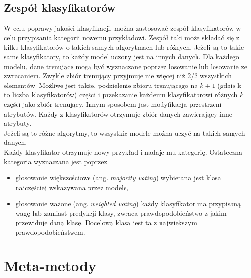   	
\subsection{Zespół klasyfikatorów}
W celu poprawy jakości klasyfikacji, można zastosować zespół klasyfikatorów w celu przypisania kategorii nowemu przykładowi. Zespół taki może składać się z kilku klasyfikatorów o takich samych algorytmach lub różnych. Jeżeli są to takie same klasyfikatory, to każdy model uczony jest na innych danych. Dla każdego modelu, dane trenujące mogą być wyznaczane poprzez losowanie lub losowanie ze zwracaniem. Zwykle zbiór trenujący przyjmuje nie więcej niż 2/3 wszystkich elementów. Możliwe jest także, podzielenie zbioru trenującego na $k+1$ (gdzie k to liczba klasyfikatorów) części i przekazanie każdemu klasyfikatorowi różnych $k$ części jako zbiór trenujący. Innym sposobem jest modyfikacja przestrzeni atrybutów. Każdy z klasyfikatorów otrzymuje zbiór danych zawierający inne atrybuty. \\
Jeżeli są to różne algorytmy, to wszystkie modele można uczyć na takich samych danych. \\
Każdy klasyfikator otrzymuje nowy przykład i nadaje mu kategorię. Ostateczna kategoria wyznaczana jest poprzez:
\begin{itemize}
	\item głosowanie większościowe (ang. \textit{majority voting}) wybierana jest klasa najczęściej wskazywana przez modele,
	\item głosowanie ważone (ang. \textit{weighted voting}) każdy klasyfikator ma przypisaną wagę lub zamiast predykcji klasy, zwraca prawdopodobieństwo z jakim przewiduje daną klasę. Docelową klasą jest ta z największym prawdopodobieństwem.
\end{itemize} 
\section{Meta-metody}
